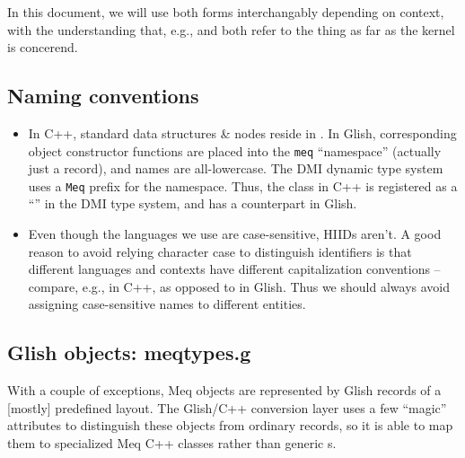   In this document, we will use both forms interchangably depending on context,
  with the understanding that, e.g.,  and 
  both refer to the thing as far as the kernel is concerend.

\subsection{Naming conventions}

  \begin{itemize}

  \item In C++, standard data structures \& nodes reside in .
    In Glish, corresponding object constructor functions are placed into the
    {\tt meq} ``namespace'' (actually just a record), and names are
    all-lowercase. The DMI dynamic type system uses a {\tt Meq} prefix for the
    namespace. Thus, the  class in C++ is registered as a
    ``'' in the DMI type system, and  has a 
    counterpart in Glish.

  \item Even though the languages we use are case-sensitive, HIIDs aren't. A
    good reason to avoid relying character case to distinguish identifiers is
    that different languages and contexts have different capitalization
    conventions -- compare, e.g.,  in C++, as opposed to
     in Glish. Thus we should always avoid assigning
    case-sensitive names to different entities.

  \end{itemize}

\subsection{Glish  objects: meqtypes.g}

  With a couple of exceptions, Meq objects are represented by Glish records of
  a [mostly] predefined layout. The Glish/C++ conversion layer uses a few
  ``magic'' attributes to distinguish these objects from ordinary records, so
  it is able to map them to specialized Meq C++ classes rather than generic
  s. 

